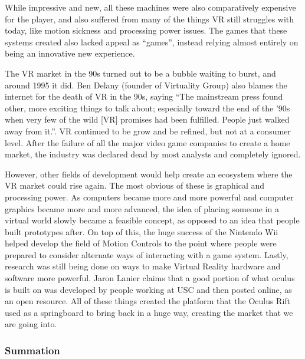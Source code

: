 \documentclass[a4paper,10pt]{article}
\begin{document}
	While impressive and new, all these machines were also comparatively expensive for the player, and also suffered from many of the things VR still struggles with today, like motion sickness and processing power issues.  The games that these systems created also lacked appeal as “games”, instead relying almost entirely on being an innovative new experience.  
	
	The VR market in the 90s turned out to be a bubble waiting to burst, and around 1995 it did.  Ben Delany (founder of Virtuality Group) also blames the internet for the death of VR in the 90s, saying “The mainstream press found other, more exciting things to talk about; especially toward the end of the ’90s when very few of the wild [VR] promises had been fulfilled. People just walked away from it.”.
	VR continued to be grow and be refined, but not at a consumer level.  After the failure of all the major video game companies to create a home market, the industry was declared dead by most analysts and completely ignored.  
	
	However, other fields of development would help create an ecosystem where the VR market could rise again.  The most obvious of these is graphical and processing power.  As computers became more and more powerful and computer graphics became more and more advanced, the idea of placing someone in a virtual world slowly became a feasible concept, as opposed to an idea that people built prototypes after.  On top of this, the huge success of the Nintendo Wii helped develop the field of Motion Controls to the point where people were prepared to consider alternate ways of interacting with a game system.  Lastly, research was still being done on ways to make Virtual Reality hardware and software more powerful.  Jaron Lanier claims that a good portion of what oculus is built on was developed by people working at USC and then posted online, as an open resource.  All of these things created the platform that the Oculus Rift used as a springboard to bring back in a huge way, creating the market that we are going into.
	\subsubsection{Summation}
	
\end{document}
